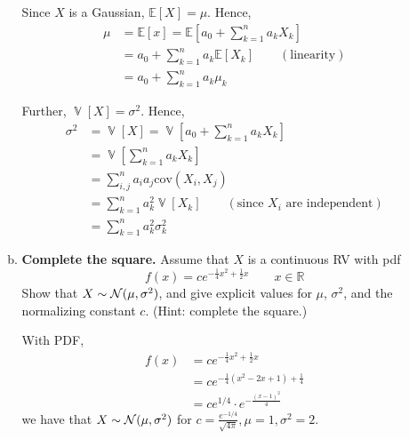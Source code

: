 \documentclass[12pt]{article}
\newcommand{\R}{\mathbb{R}}
\newcommand{\E}{\mathbb{E}}
\DeclareMathOperator{\Var}{\mathbb{V}}
\begin{document}
\begin{enumerate}[1.]
\begin{enumerate}[(a)]
		            \color{blue}
		            Since $X$ is a Gaussian, $\E[X] = \mu$.  Hence,
		            \begin{align*}
			            \mu & = \E[x] = \E\left[a_0 + \sum_{k=1}^{n} a_k X_k\right]         \\
			                & = a_0 + \sum_{k=1}^{n} a_k \E[X_k]  \qquad (\text{linearity}) \\
			                & = a_0 + \sum_{k=1}^{n} a_k \mu_k
		            \end{align*}

		            Further, $\Var[X] = \sigma^2$. Hence,
		            \begin{align*}
			            \sigma^2 & = \Var[X] = \Var\left[a_0 + \sum_{k=1}^{n} a_k X_k\right]                         \\
			                     & = \Var\left[\sum_{k=1}^{n} a_k X_k\right]                                         \\
			                     & = \sum_{i, j}^n a_i a_j \text{cov}(X_i, X_j)                                      \\
			                     & = \sum_{k=1}^n a_k^2 \Var[X_k] \qquad (\text{since } X_i \text{ are independent}) \\
			                     & = \sum_{k=1}^n a_k^2 \sigma_k^2
		            \end{align*}
		            \color{black}


		      \item {\bf Complete the square.}
		            Assume that $X$ is a continuous RV with pdf
		            \[
			            f(x) = c e^{-\frac{1}{4}x^2 + \frac{1}{2}x} \qquad x\in\R
		            \]
		            Show that $X \sim {\cal N}(\mu,\sigma^2)$, and give explicit values for $\mu$, $\sigma^2$, and the normalizing constant $c$. (Hint: complete the square.)

		            \color{blue}
		            With PDF,
		            \begin{align*}
			            f(x) & = c e^{-\frac{1}{4}x^2 + \frac{1}{2}x}           \\
			                 & = c e^{-\frac{1}{4}(x^2 - 2x + 1) + \frac{1}{4}} \\
			                 & = ce^{1/4} \cdot e^{-\frac{(x - 1)^2}{4}}
		            \end{align*}
		            we have that $X \sim {\cal N}(\mu, \sigma^2)$ for $\boxed{c = \frac{e^{-1/4}}{\sqrt{4\pi}}, \mu = 1, \sigma^2 = 2}$.
		            \color{black}


\end{enumerate}
\end{enumerate}
\end{document}
